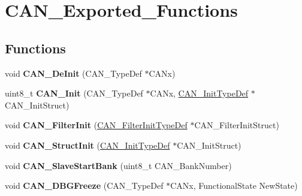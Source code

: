 \hypertarget{group__CAN__Exported__Functions}{
\section{CAN\_\-Exported\_\-Functions}
\label{group__CAN__Exported__Functions}
}
\subsection*{Functions}
\begin{DoxyCompactItemize}
\item 
\hypertarget{group__CAN__Exported__Functions_ga002b74cd69574a14b17ad445090245cd}{
void {\bfseries CAN\_\-DeInit} (CAN\_\-TypeDef $\ast$CANx)}
\label{group__CAN__Exported__Functions_ga002b74cd69574a14b17ad445090245cd}

\item 
\hypertarget{group__CAN__Exported__Functions_ga9023c35a9ab931ad4513fc5d19b4bd6c}{
uint8\_\-t {\bfseries CAN\_\-Init} (CAN\_\-TypeDef $\ast$CANx, \hyperlink{structCAN__InitTypeDef}{CAN\_\-InitTypeDef} $\ast$CAN\_\-InitStruct)}
\label{group__CAN__Exported__Functions_ga9023c35a9ab931ad4513fc5d19b4bd6c}

\item 
\hypertarget{group__CAN__Exported__Functions_ga39476830280340363c51041be6b12647}{
void {\bfseries CAN\_\-FilterInit} (\hyperlink{structCAN__FilterInitTypeDef}{CAN\_\-FilterInitTypeDef} $\ast$CAN\_\-FilterInitStruct)}
\label{group__CAN__Exported__Functions_ga39476830280340363c51041be6b12647}

\item 
\hypertarget{group__CAN__Exported__Functions_gad77ad810868ed111755fc9e8ae0c7646}{
void {\bfseries CAN\_\-StructInit} (\hyperlink{structCAN__InitTypeDef}{CAN\_\-InitTypeDef} $\ast$CAN\_\-InitStruct)}
\label{group__CAN__Exported__Functions_gad77ad810868ed111755fc9e8ae0c7646}

\item 
\hypertarget{group__CAN__Exported__Functions_ga109ff8960bc59f44b984c9646f17b3c0}{
void {\bfseries CAN\_\-SlaveStartBank} (uint8\_\-t CAN\_\-BankNumber)}
\label{group__CAN__Exported__Functions_ga109ff8960bc59f44b984c9646f17b3c0}

\item 
\hypertarget{group__CAN__Exported__Functions_gac0e2d33e08caf49d1f1251f0dcc20213}{
void {\bfseries CAN\_\-DBGFreeze} (CAN\_\-TypeDef $\ast$CANx, FunctionalState NewState)}
\label{group__CAN__Exported__Functions_gac0e2d33e08caf49d1f1251f0dcc20213}


\end{DoxyCompactItemize}
